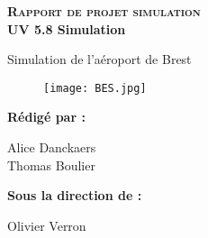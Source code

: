 
\begingroup
\thispagestyle{empty}
\begin{center}
\vspace*{2cm}
{\Huge \textsc{\textbf{Rapport de projet simulation}}}\\
\vspace*{2cm}
{\Huge \textbf{UV 5.8 Simulation}}\par 
\vspace*{2cm}
{\huge Simulation de l'aéroport de Brest}\par %
\end{center}
\vspace*{2cm}

\begin{figure}[h!]
\centering\texttt{[image: BES.jpg]}
\end{figure}

\textbf{\large Rédigé par :} 

\begin{center}
{
\large
Alice Danckaers\\
Thomas Boulier
}
\end{center}

\vspace*{1cm}

{\large \textbf{Sous la direction de :}}\\
\begin{center}
{\large
Olivier Verron\\
}
\end{center}
\endgroup
